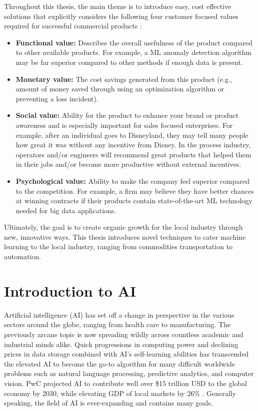 Throughout this thesis, the main theme is to introduce easy, cost effective solutions that explicitly considers the following four customer focused values required for successful commercial products \cite{marketing}:
\begin{itemize}
    \item \textbf{Functional value:} Describes the overall usefulness of the product compared to other available products.  For example, a ML anomaly detection algorithm may be far superior compared to other methods if enough data is present.
    \item \textbf{Monetary value:} The cost savings generated from this product (e.g., amount of money saved through using an optimization algorithm or preventing a loss incident).  
    \item \textbf{Social value:} Ability for the product to enhance your brand or product awareness and is especially important for sales focused enterprises.  For example, after an individual goes to Disneyland, they may tell many people how great it was without any incentive from Disney.  In the process industry, operators and/or engineers will recommend great products that helped them in their jobs and/or become more productive without external incentives.
    \item \textbf{Psychological value:} Ability to make the company feel superior compared to the competition.  For example, a firm may believe they have better chances at winning contracts if their products contain state-of-the-art ML technology needed for big data applications.
\end{itemize}
Ultimately, the goal is to create organic growth for the local industry through new, innovative ways. This thesis introduces novel techniques to cater machine learning to the local industry, ranging from commodities transportation to automation.

\section{Introduction to AI}
Artificial intelligence (AI) has set off a change in perspective in the various sectors around the globe, ranging from health care to manufacturing.  The previously arcane topic is now spreading wildly across countless academic and industrial minds alike. Quick progressions in computing power and declining prices in data storage combined with AI's self-learning abilities has transcended the elevated AI to become the go-to algorithm for many difficult worldwide problems such as natural language processing, predictive analytics, and computer vision.  PwC projected AI to contribute well over \$15 trillion USD to the global economy by 2030, while elevating GDP of local markets by 26\%  \cite{pwc}. Generally speaking, the field of AI is ever-expanding and contains many goals.

